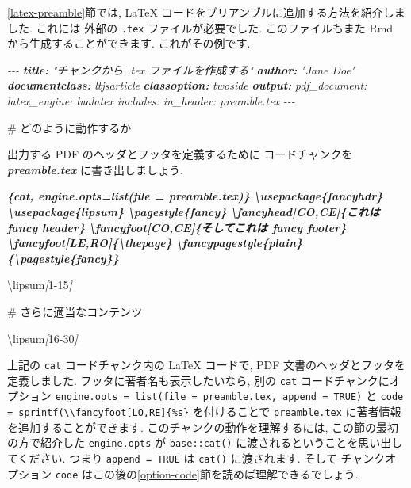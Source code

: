 \documentclass[
  11pt,
]{bxjsreport}
\newenvironment{Shaded}{\begin{snugshade}}{\end{snugshade}}
\newcommand{\AnnotationTok}[1]{\textcolor[rgb]{0.56,0.35,0.01}{\textbf{\textit{#1}}}}
\newcommand{\CommentTok}[1]{\textcolor[rgb]{0.56,0.35,0.01}{\textit{#1}}}
\newcommand{\FunctionTok}[1]{\textcolor[rgb]{0.00,0.00,0.00}{#1}}
\newcommand{\InformationTok}[1]{\textcolor[rgb]{0.56,0.35,0.01}{\textbf{\textit{#1}}}}
\newcommand{\NormalTok}[1]{#1}
\newcommand{\OtherTok}[1]{\textcolor[rgb]{0.56,0.35,0.01}{#1}}
\begin{document}
\ref{latex-preamble}節では, LaTeX コードをプリアンブルに追加する方法を紹介しました. これには 外部の \texttt{.tex} ファイルが必要でした. このファイルもまた Rmd から生成することができます. これがその例です.

\begin{Shaded}
\begin{Highlighting}[]
\CommentTok{{-}{-}{-}}
\AnnotationTok{title:}\CommentTok{ "チャンクから .tex ファイルを作成する"}
\AnnotationTok{author:}\CommentTok{ "Jane Doe"}
\AnnotationTok{documentclass:}\CommentTok{ ltjsarticle}
\AnnotationTok{classoption:}\CommentTok{ twoside}
\AnnotationTok{output:}\CommentTok{ }
\CommentTok{  pdf\_document:}
\CommentTok{    latex\_engine: lualatex}
\CommentTok{    includes:}
\CommentTok{      in\_header: preamble.tex}
\CommentTok{{-}{-}{-}}

\FunctionTok{\# どのように動作するか}

\NormalTok{出力する PDF のヘッダとフッタを定義するために}
\NormalTok{コードチャンクを }\InformationTok{\textasciigrave{}preamble.tex\textasciigrave{}}\NormalTok{ に書き出しましょう.}

\InformationTok{\textasciigrave{}\textasciigrave{}\textasciigrave{}\{cat, engine.opts=list(file = \textquotesingle{}preamble.tex\textquotesingle{})\}}
\InformationTok{\textbackslash{}usepackage\{fancyhdr\}}
\InformationTok{\textbackslash{}usepackage\{lipsum\}}
\InformationTok{\textbackslash{}pagestyle\{fancy\}}
\InformationTok{\textbackslash{}fancyhead[CO,CE]\{これは fancy header\}}
\InformationTok{\textbackslash{}fancyfoot[CO,CE]\{そしてこれは fancy footer\}}
\InformationTok{\textbackslash{}fancyfoot[LE,RO]\{\textbackslash{}thepage\}}
\InformationTok{\textbackslash{}fancypagestyle\{plain\}\{\textbackslash{}pagestyle\{fancy\}\}}
\InformationTok{\textasciigrave{}\textasciigrave{}\textasciigrave{}}

\NormalTok{\textbackslash{}lipsum}\CommentTok{[}\OtherTok{1{-}15}\CommentTok{]}

\FunctionTok{\# さらに適当なコンテンツ}

\NormalTok{\textbackslash{}lipsum}\CommentTok{[}\OtherTok{16{-}30}\CommentTok{]}
\end{Highlighting}
\end{Shaded}

上記の \texttt{cat} コードチャンク内の LaTeX コードで, PDF 文書のヘッダとフッタを定義しました. フッタに著者名も表示したいなら, 別の \texttt{cat} コードチャンクにオプション \texttt{engine.opts = list(file = \textquotesingle{}preamble.tex\textquotesingle{},\ append\ =\ TRUE)} と \texttt{code = sprintf(\textquotesingle{}\textbackslash{}\textbackslash{}fancyfoot{[}LO,RE{]}\{\%s\}\textquotesingle{}} を付けることで \texttt{preamble.tex} に著者情報を追加することができます. このチャンクの動作を理解するには, この節の最初の方で紹介した \texttt{engine.opts} が \texttt{base::cat()} に渡されるということを思い出してください. つまり \texttt{append = TRUE} は \texttt{cat()} に渡されます. そして チャンクオプション \texttt{code} はこの後の\ref{option-code}節を読めば理解できるでしょう.
\end{document}
